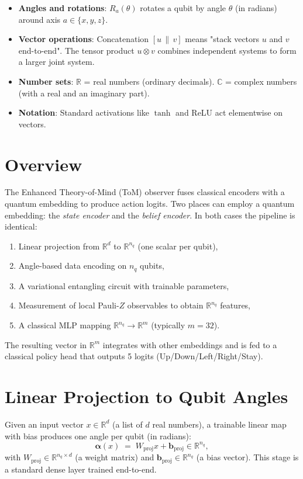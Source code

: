 \documentclass[11pt]{article}
\begin{document}
\begin{itemize}
  \item \textbf{Angles and rotations}: $R_a(\theta)$ rotates a qubit by angle $\theta$ (in radians) around axis $a\in\{x,y,z\}$.
  \item \textbf{Vector operations}: Concatenation $[u\,\|\,v]$ means "stack vectors $u$ and $v$ end-to-end". The tensor product $u\otimes v$ combines independent systems to form a larger joint system.
  \item \textbf{Number sets}: $\mathbb{R}$ = real numbers (ordinary decimals). $\mathbb{C}$ = complex numbers (with a real and an imaginary part).
  \item \textbf{Notation}: Standard activations like $\tanh$ and ReLU act elementwise on vectors.
\end{itemize}


\section{Overview}

The Enhanced Theory-of-Mind (ToM) observer fuses classical encoders with a quantum embedding to produce action logits. Two places can employ a quantum embedding: the \emph{state encoder} and the \emph{belief encoder}. In both cases the pipeline is identical:
\begin{enumerate}
  \item Linear projection from $\mathbb{R}^d$ to $\mathbb{R}^{n_q}$ (one scalar per qubit),
  \item Angle-based data encoding on $n_q$ qubits,
  \item A variational entangling circuit with trainable parameters,
  \item Measurement of local Pauli-$Z$ observables to obtain $\mathbb{R}^{n_q}$ features,
  \item A classical MLP mapping $\mathbb{R}^{n_q}\to \mathbb{R}^{m}$ (typically $m=32$).
\end{enumerate}
The resulting vector in $\mathbb{R}^{m}$ integrates with other embeddings and is fed to a classical policy head that outputs 5 logits (Up/Down/Left/Right/Stay).

\section{Linear Projection to Qubit Angles}

Given an input vector $x\in\mathbb{R}^{d}$ (a list of $d$ real numbers), a trainable linear map with bias produces one angle per qubit (in radians):
\begin{equation}
\label{eq:proj}
\bm{\alpha}(x) \;=\; W_{\mathrm{proj}} x + \bm{b}_{\mathrm{proj}} \in \mathbb{R}^{n_q},
\end{equation}
with $W_{\mathrm{proj}}\in\mathbb{R}^{n_q\times d}$ (a weight matrix) and $\bm{b}_{\mathrm{proj}}\in\mathbb{R}^{n_q}$ (a bias vector). This stage is a standard dense layer trained end-to-end.
\end{document}

